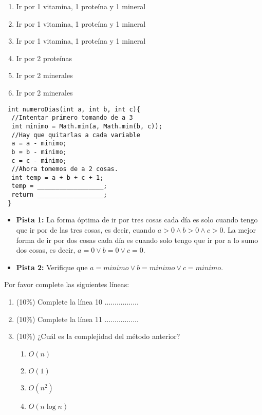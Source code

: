 \documentclass[10 pt]{article}
\begin{document}
\begin{multicols}{2}
\begin{enumerate}
\item Ir por 1 vitamina, 1 proteína y 1 mineral
\item Ir por 1 vitamina, 1 proteína y 1 mineral
\item Ir por 1 vitamina, 1 proteína y 1 mineral
\item Ir por 2 proteínas
\item Ir por 2 minerales
\item Ir por 2 minerales
\end{enumerate}
{\footnotesize
\begin{lstlisting}
 int numeroDias(int a, int b, int c){
  //Intentar primero tomando de a 3
  int minimo = Math.min(a, Math.min(b, c));
  //Hay que quitarlas a cada variable
  a = a - minimo;
  b = b - minimo;
  c = c - minimo;
  //Ahora tomemos de a 2 cosas.
  int temp = a + b + c + 1;
  temp = __________________;
  return __________________;
 }
\end{lstlisting}
}
\begin{itemize}
\item \textbf{Pista 1: } La forma óptima de ir por tres cosas cada día es solo cuando tengo que ir por de las tres cosas, es decir, cuando $a > 0 \land b > 0 \land c > 0$. La mejor forma de ir por dos cosas cada día es cuando solo tengo que ir por a lo sumo dos cosas, es decir, $a = 0 \lor b = 0 \lor c = 0$.
\item \textbf{Pista 2: } Verifique que $a = minimo \lor b = minimo \lor c = minimo$.
\end{itemize}
Por favor complete las siguientes líneas:
\begin{enumerate}[label=(\alph*)]
\item (10\%) Complete la línea 10 .................
\item (10\%) Complete la línea 11 .................
\item (10\%) ¿Cuál es la complejidad del método anterior?
\begin{enumerate}[label=(\roman*)]
\item $O(n)$
\item $O(1)$
\item $O(n^2)$
\item $O(n \log n)$
\end{enumerate}
\end{enumerate}



\end{multicols}


\end{document}
